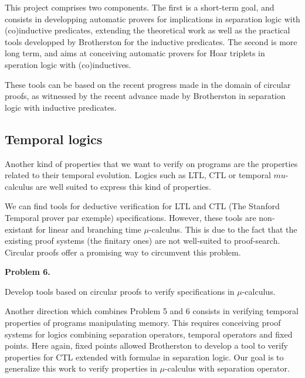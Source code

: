 \documentclass{article}
\begin{document}
This project comprises two components. The first is a short-term goal, and consists in developping automatic provers 
for implications in separation logic with (co)inductive predicates, extending the theoretical work as well as the practical tools developped by Brotherston for the inductive predicates. The second is more long term, and aims at conceiving automatic provers for Hoar triplets in speration logic with (co)inductives. 

These tools can be based on the recent progress made in the domain of circular proofs, as witnessed  by the recent advance made by Brotherston in separation logic with inductive predicates.


\subsection{Temporal logics}

Another kind of properties that we want to verify on programs are the properties related to their temporal evolution. Logics such as LTL, CTL or temporal $mu$-calculus are well suited to express this kind of properties. 

We can find tools for deductive verification for LTL and CTL (The Stanford Temporal prover par exemple) specifications. However, these tools are non-existant for linear and branching time $\mu$-calculus. This is due to the fact that the existing proof systems (the finitary ones) are not well-suited to proof-search. Circular proofs offer a promising way to circumvent this problem. 


\begin{center}
\begin{bclogo}[logo= ,arrondi = 0.1, couleur = green!10,  epBarre = 0]{}
  \vspace{-10pt}
  \textbf{Problem 6.}
  
  Develop tools based on circular proofs to verify specifications in $\mu$-calculus.
\end{bclogo}
\end{center}

Another direction which combines Problem 5 and 6 consists in verifying temporal properties of programs manipulating memory. This requires conceiving proof systems for logics combining separation operators, temporal operators and fixed points. Here again, fixed points allowed Brotherston to develop a tool  \cite{TellezB17} to verify properties for CTL extended with formulae in separation logic. Our goal is to generalize this work to verify properties in $\mu$-calculus with separation operator.



\end{document}
